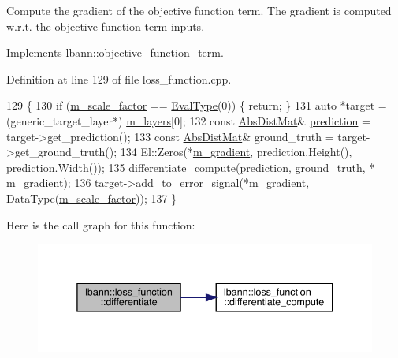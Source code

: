 Compute the gradient of the objective function term. The gradient is computed w.\+r.\+t. the objective function term inputs. 

Implements \hyperlink{classlbann_1_1objective__function__term_ad009c3cfbe1cf2fbb6cce015b16fdac5}{lbann\+::objective\+\_\+function\+\_\+term}.



Definition at line 129 of file loss\+\_\+function.\+cpp.


\begin{DoxyCode}
129                                   \{
130   \textcolor{keywordflow}{if} (\hyperlink{classlbann_1_1objective__function__term_a59a544b8ff0455ed5091de3bf0d81c3c}{m\_scale\_factor} == \hyperlink{base_8hpp_a3266f5ac18504bbadea983c109566867}{EvalType}(0)) \{ \textcolor{keywordflow}{return}; \}
131   \textcolor{keyword}{auto} *target = (generic\_target\_layer*) \hyperlink{classlbann_1_1objective__function__term_a9269cf0a237eacd1e220ba2739f44334}{m\_layers}[0];
132   \textcolor{keyword}{const} \hyperlink{base_8hpp_a9a697a504ae84010e7439ffec862b470}{AbsDistMat}& \hyperlink{base_8hpp_a2781a159088df64ed7d47cc91c4dc0a8ac41b9ec75e920b610e8907e066074b30}{prediction} = target->get\_prediction();
133   \textcolor{keyword}{const} \hyperlink{base_8hpp_a9a697a504ae84010e7439ffec862b470}{AbsDistMat}& ground\_truth = target->get\_ground\_truth();
134   El::Zeros(*\hyperlink{classlbann_1_1loss__function_ac6ac9f8f2cef7a4daa1b282dba914975}{m\_gradient}, prediction.Height(), prediction.Width());
135   \hyperlink{classlbann_1_1loss__function_aefccc2b4f5a02664002d12630cf369e7}{differentiate\_compute}(prediction, ground\_truth, *
      \hyperlink{classlbann_1_1loss__function_ac6ac9f8f2cef7a4daa1b282dba914975}{m\_gradient});
136   target->add\_to\_error\_signal(*\hyperlink{classlbann_1_1loss__function_ac6ac9f8f2cef7a4daa1b282dba914975}{m\_gradient}, DataType(\hyperlink{classlbann_1_1objective__function__term_a59a544b8ff0455ed5091de3bf0d81c3c}{m\_scale\_factor}));
137 \}
\end{DoxyCode}
Here is the call graph for this function\+:\nopagebreak
\begin{figure}[H]
\begin{center}
\leavevmode
\includegraphics[width=338pt]{classlbann_1_1loss__function_adbd03ef952ee1055e3dd98f06d33324f_cgraph}
\end{center}
\end{figure}
\mbox{\label{classlbann_1_1loss__function_aefccc2b4f5a02664002d12630cf369e7}} 

